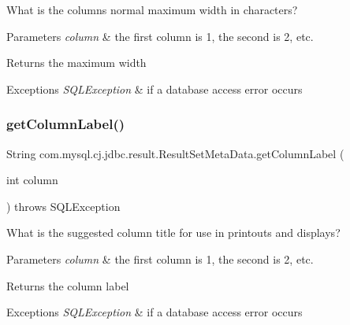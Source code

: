 What is the column\textquotesingle{}s normal maximum width in characters?


\begin{DoxyParams}{Parameters}
{\em column} & the first column is 1, the second is 2, etc.\\
\hline
\end{DoxyParams}
\begin{DoxyReturn}{Returns}
the maximum width
\end{DoxyReturn}

\begin{DoxyExceptions}{Exceptions}
{\em S\+Q\+L\+Exception} & if a database access error occurs \\
\hline
\end{DoxyExceptions}
\mbox{\label{classcom_1_1mysql_1_1cj_1_1jdbc_1_1result_1_1_result_set_meta_data_a61dd71656173944ed359540d5f2146a3}} 
\subsubsection{\texorpdfstring{get\+Column\+Label()}{getColumnLabel()}}
{\footnotesize\ttfamily String com.\+mysql.\+cj.\+jdbc.\+result.\+Result\+Set\+Meta\+Data.\+get\+Column\+Label (\begin{DoxyParamCaption}\item[{int}]{column }\end{DoxyParamCaption}) throws S\+Q\+L\+Exception}

What is the suggested column title for use in printouts and displays?


\begin{DoxyParams}{Parameters}
{\em column} & the first column is 1, the second is 2, etc.\\
\hline
\end{DoxyParams}
\begin{DoxyReturn}{Returns}
the column label
\end{DoxyReturn}

\begin{DoxyExceptions}{Exceptions}
{\em S\+Q\+L\+Exception} & if a database access error occurs \\
\hline
\end{DoxyExceptions}
\mbox{\label{classcom_1_1mysql_1_1cj_1_1jdbc_1_1result_1_1_result_set_meta_data_a31a13a989ee87ea1a9f1f4aa874bd771}} 
